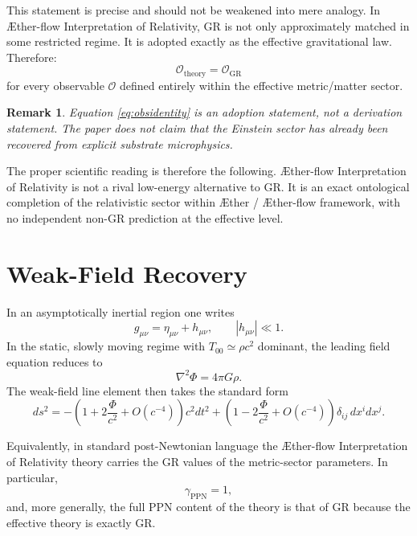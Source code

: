 \documentclass[11pt]{article}
\newcommand{\Aether}{\AE{}ther}
\newcommand{\Aflow}{\AE{}ther-flow}
\newcommand{\TheoryName}{\Aflow{} Interpretation of Relativity}
\newcommand{\TheoryProgram}{\Aether{} / \Aflow{} framework}
\newtheorem{remark}{Remark}
\begin{document}
This statement is precise and should not be weakened into mere analogy. In \TheoryName{}, GR is not only approximately matched in some restricted regime. It is adopted exactly as the effective gravitational law. Therefore:
\begin{equation}
\mathcal{O}_{\mathrm{theory}}
=
\mathcal{O}_{\mathrm{GR}}
\label{eq:obsidentity}
\end{equation}
for every observable \(\mathcal{O}\) defined entirely within the effective metric/matter sector.

\begin{remark}
Equation \eqref{eq:obsidentity} is an adoption statement, not a derivation statement. The paper does not claim that the Einstein sector has already been recovered from explicit substrate microphysics.
\end{remark}

The proper scientific reading is therefore the following. \TheoryName{} is not a rival low-energy alternative to GR. It is an exact ontological completion of the relativistic sector within \TheoryProgram{}, with no independent non-GR prediction at the effective level.

\section{Weak-Field Recovery}

In an asymptotically inertial region one writes
\begin{equation}
g_{\mu\nu}=\eta_{\mu\nu}+h_{\mu\nu},
\qquad
|h_{\mu\nu}|\ll 1.
\label{eq:linearizedmetric}
\end{equation}
In the static, slowly moving regime with \(T_{00}\simeq \rho c^2\) dominant, the leading field equation reduces to
\begin{equation}
\nabla^2\Phi = 4\pi G\rho.
\label{eq:poisson}
\end{equation}
The weak-field line element then takes the standard form
\begin{equation}
ds^2
=
-\left(1+2\frac{\Phi}{c^2}+O(c^{-4})\right)c^2dt^2
+
\left(1-2\frac{\Phi}{c^2}+O(c^{-4})\right)\delta_{ij}\,dx^i dx^j.
\label{eq:weakfield}
\end{equation}

Equivalently, in standard post-Newtonian language the \TheoryName{} theory carries the GR values of the metric-sector parameters. In particular,
\begin{equation}
\gamma_{\mathrm{PPN}} = 1,
\label{eq:ppngamma}
\end{equation}
and, more generally, the full PPN content of the theory is that of GR because the effective theory is exactly GR.
\end{document}
